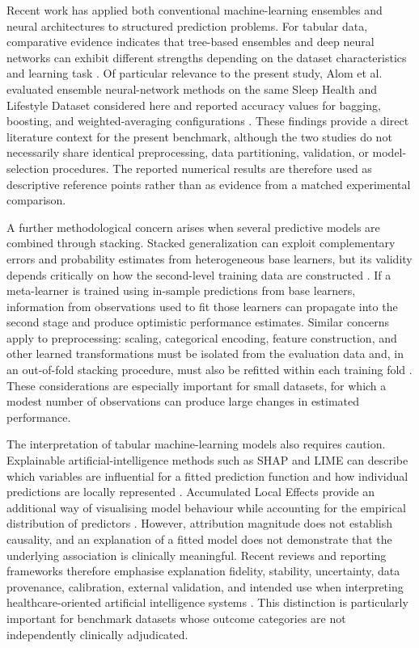 \documentclass[a4paper,fleqn]{cas-dc}
\begin{document}
Recent work has applied both conventional machine-learning ensembles and neural architectures to structured prediction problems. For tabular data, comparative evidence indicates that tree-based ensembles and deep neural networks can exhibit different strengths depending on the dataset characteristics and learning task \cite{borisov2024}. Of particular relevance to the present study, Alom et al. evaluated ensemble neural-network methods on the same Sleep Health and Lifestyle Dataset considered here and reported accuracy values for bagging, boosting, and weighted-averaging configurations \cite{alom2024}. These findings provide a direct literature context for the present benchmark, although the two studies do not necessarily share identical preprocessing, data partitioning, validation, or model-selection procedures. The reported numerical results are therefore used as descriptive reference points rather than as evidence from a matched experimental comparison.


A further methodological concern arises when several predictive models are combined through stacking. Stacked generalization can exploit complementary errors and probability estimates from heterogeneous base learners, but its validity depends critically on how the second-level training data are constructed \cite{wolpert1992}. If a meta-learner is trained using in-sample predictions from base learners, information from observations used to fit those learners can propagate into the second stage and produce optimistic performance estimates. Similar concerns apply to preprocessing: scaling, categorical encoding, feature construction, and other learned transformations must be isolated from the evaluation data and, in an out-of-fold stacking procedure, must also be refitted within each training fold \cite{kapoor2023,efthimiou2024,collins2024}. These considerations are especially important for small datasets, for which a modest number of observations can produce large changes in estimated performance.

The interpretation of tabular machine-learning models also requires caution. Explainable artificial-intelligence methods such as SHAP and LIME can describe which variables are influential for a fitted prediction function and how individual predictions are locally represented \cite{lundberg2017,ribeiro2016,instanceshap2023}. Accumulated Local Effects provide an additional way of visualising model behaviour while accounting for the empirical distribution of predictors \cite{apley2020}. However, attribution magnitude does not establish causality, and an explanation of a fitted model does not demonstrate that the underlying association is clinically meaningful. Recent reviews and reporting frameworks therefore emphasise explanation fidelity, stability, uncertainty, data provenance, calibration, external validation, and intended use when interpreting healthcare-oriented artificial intelligence systems \cite{jung2023,allen2024,tripodai2024,futureai2025}. This distinction is particularly important for benchmark datasets whose outcome categories are not independently clinically adjudicated.
\end{document}
